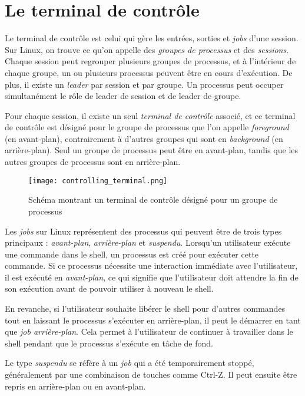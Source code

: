 \section{Le terminal de contrôle}
Le terminal de contrôle est celui qui gère les entrées, sorties et \textit{jobs} d'une session. Sur Linux, on trouve ce qu'on appelle des \textit{groupes de processus} et des \textit{sessions}. Chaque session peut regrouper plusieurs groupes de processus, et à l'intérieur de chaque groupe, un ou plusieurs processus peuvent être en cours d'exécution. De plus, il existe un \textit{leader} par session et par groupe. Un processus peut occuper simultanément le rôle de leader de session et de leader de groupe.

Pour chaque session, il existe un seul \textit{terminal de contrôle} associé, et ce terminal de contrôle est désigné pour le groupe de processus que l'on appelle \textit{foreground} (en avant-plan), contrairement à d'autres groupes qui sont en \textit{background} (en arrière-plan). Seul un groupe de processus peut être en avant-plan, tandis que les autres groupes de processus sont en arrière-plan.

\begin{figure}[h]
        \centering
        \texttt{[image: controlling\_terminal.png]}
        \caption{Schéma montrant un terminal de contrôle désigné pour un groupe de processus}
\end{figure}

Les \textit{jobs} sur Linux représentent des processus qui peuvent être de trois types principaux : \textit{avant-plan}, \textit{arrière-plan} et \textit{suspendu}. Lorsqu'un utilisateur exécute une commande dans le shell, un processus est créé pour exécuter cette commande. Si ce processus nécessite une interaction immédiate avec l'utilisateur, il est exécuté en \textit{avant-plan}, ce qui signifie que l'utilisateur doit attendre la fin de son exécution avant de pouvoir utiliser à nouveau le shell.

En revanche, si l'utilisateur souhaite libérer le shell pour d'autres commandes tout en laissant le processus s'exécuter en arrière-plan, il peut le démarrer en tant que \textit{job arrière-plan}. Cela permet à l'utilisateur de continuer à travailler dans le shell pendant que le processus s'exécute en tâche de fond.

Le type \textit{suspendu} se réfère à un \textit{job} qui a été temporairement stoppé, généralement par une combinaison de touches comme Ctrl-Z. Il peut ensuite être repris en arrière-plan ou en avant-plan.

